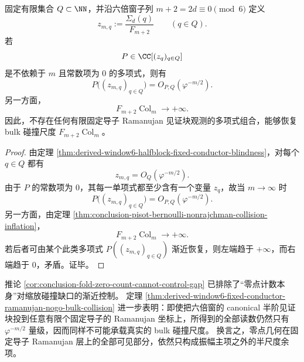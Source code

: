 \begin{theorem}\label{thm:derived-window6-fixed-conductor-ramanujan-nogo-bulk-collision}
固定有限集合 \(Q\subset \NN\)，并沿六倍窗子列 \(m+2=2d\equiv 0\pmod 6\) 定义
\[
z_{m,q}:=\frac{\Sigma_d(q)}{F_{m+2}}
\qquad (q\in Q).
\]
若
\[
P\in \CC[(z_q)_{q\in Q}]
\]
是不依赖于 \(m\) 且常数项为 \(0\) 的多项式，则有
\[
\boxed{\;
P\bigl((z_{m,q})_{q\in Q}\bigr)=O_{P,Q}(\varphi^{-m/2}).\;}
\]
另一方面，
\[
F_{m+2}\operatorname{Col}_m\longrightarrow +\infty.
\]
因此，不存在任何有限固定导子 Ramanujan 见证块观测的多项式组合，能够恢复 bulk 碰撞尺度 \(F_{m+2}\operatorname{Col}_m\)。
\end{theorem}

\begin{proof}
由定理 \ref{thm:derived-window6-halfblock-fixed-conductor-blindness}，对每个 \(q\in Q\) 都有
\[
z_{m,q}=O_Q(\varphi^{-m/2}).
\]
由于 \(P\) 的常数项为 \(0\)，其每一单项式都至少含有一个变量 \(z_q\)，故当 \(m\to\infty\) 时
\[
P\bigl((z_{m,q})_{q\in Q}\bigr)=O_{P,Q}(\varphi^{-m/2}).
\]
另一方面，由定理 \ref{thm:conclusion-pisot-bernoulli-nonrajchman-collision-inflation}，
\[
F_{m+2}\operatorname{Col}_m\to +\infty.
\]
若后者可由某个此类多项式 \(P((z_{m,q})_{q\in Q})\) 渐近恢复，则左端趋于 \(+\infty\)，而右端趋于 \(0\)，矛盾。证毕。
\end{proof}

\begin{remark}\label{rem:derived-window6-ramanujan-shadow-strengthens-zero-count-blindness}
推论 \ref{cor:conclusion-fold-zero-count-cannot-control-gap} 已排除了“零点计数本身”对缩放碰撞缺口的渐近控制。
定理 \ref{thm:derived-window6-fixed-conductor-ramanujan-nogo-bulk-collision} 进一步表明：即使把六倍窗的 canonical 半阶见证块投到任意有限个固定导子的 Ramanujan 坐标上，所得到的全部读数仍然只有 \(\varphi^{-m/2}\) 量级，因而同样不可能承载真实的 bulk 碰撞尺度。
换言之，零点几何在固定导子 Ramanujan 层上的全部可见部分，依然只构成振幅主项之外的半尺度余项。
\end{remark}

